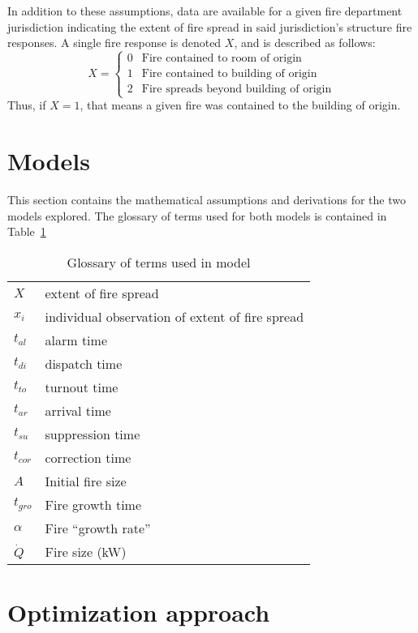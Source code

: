 \documentclass[letterpaper,11pt]{article}
\begin{document}
In addition to these assumptions, data are available for a given fire department jurisdiction indicating the extent of fire spread in said jurisdiction's structure fire responses. A single fire response is denoted $X$, and is described as follows:
\[X = \left\{
      \begin{array}{ll}
	0 & \text{Fire contained to room of origin} \\
	1 & \text{Fire contained to building of origin} \\
	2 & \text{Fire spreads beyond building of origin}
      \end{array}
      \right.
\]
Thus, if $X=1$, that means a given fire was contained to the building of origin.

\section{Models}
This section contains the mathematical assumptions and derivations for the two models explored. The glossary of terms used for both models is contained in Table~\ref{tab:terminology}
\begin{table}
  \centering
  \begin{tabular}{lp{4cm}}
    $X$ & extent of fire spread \\
    $x_i$ & individual observation of extent of fire spread \\
    $t_{al}$ & alarm time \\
    $t_{di}$ & dispatch time \\
    $t_{to}$ & turnout time \\
    $t_{ar}$ & arrival time \\
    $t_{su}$ & suppression time \\
    $t_{cor}$ & correction time \\
    $A$ & Initial fire size \\
    $t_{gro}$ & Fire growth time \\
    $\alpha$ & Fire ``growth rate'' \\
    $\dot{Q}$ & Fire size (kW) \\
  \end{tabular}
  \caption{Glossary of terms used in model}
  \label{tab:terminology}
\end{table}

\section{Optimization approach}
\end{document}
